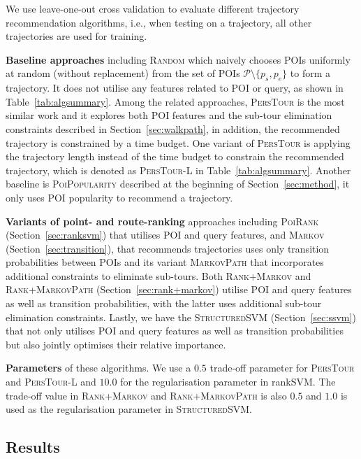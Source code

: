 We use leave-one-out cross validation to evaluate different trajectory recommendation algorithms,
i.e., when testing on a trajectory, all other trajectories are used for training.

{\bf Baseline approaches} including \textsc{Random} which naively chooses POIs uniformly at random
(without replacement) from the set of POIs $\mathcal{P} \setminus \{p_s, p_e \}$ to form a trajectory.
It does not utilise any features related to POI or query, as shown in Table~\ref{tab:algsummary}.
Among the related approaches, \textsc{PersTour}\cite{ijcai15} is the most similar work and it
explores both POI features and the sub-tour elimination constraints described in Section~\ref{sec:walkpath},
in addition, the recommended trajectory is constrained by a time budget.
One variant of \textsc{PersTour} is applying the trajectory length instead of the time budget to constrain
the recommended trajectory, which is denoted as \textsc{PersTour-L} in Table~\ref{tab:algsummary}.
Another baseline is \textsc{PoiPopularity} described at the beginning of Section~\ref{sec:method},
it only uses POI popularity to recommend a trajectory.

{\bf Variants of point- and route-ranking} approaches including \textsc{PoiRank} (Section~\ref{sec:ranksvm})
that utilises POI and query features, 
and \textsc{Markov} (Section~\ref{sec:transition}), 
that recommends trajectories uses only transition probabilities between POIs  
and its variant \textsc{MarkovPath} that incorporates additional constraints to eliminate sub-tours.
Both \textsc{Rank+Markov} and \textsc{Rank+MarkovPath} (Section~\ref{sec:rank+markov})
utilise POI and query features as well as transition probabilities, with the latter uses
additional sub-tour elimination constraints.
Lastly, we have the \textsc{StructuredSVM} (Section~\ref{sec:ssvm}) that not only utilises POI and query features 
as well as transition probabilities but also jointly optimises their relative importance.

{\bf Parameters} of these algorithms.
We use a $0.5$ trade-off parameter for \textsc{PersTour} and \textsc{PersTour-L}
and $10.0$ for the regularisation parameter in rankSVM.
The trade-off value in \textsc{Rank+Markov} and \textsc{Rank+MarkovPath} is also $0.5$
and $1.0$ is used as the regularisation parameter in \textsc{StructuredSVM}.


\subsection{Results}
\label{sec:result}


